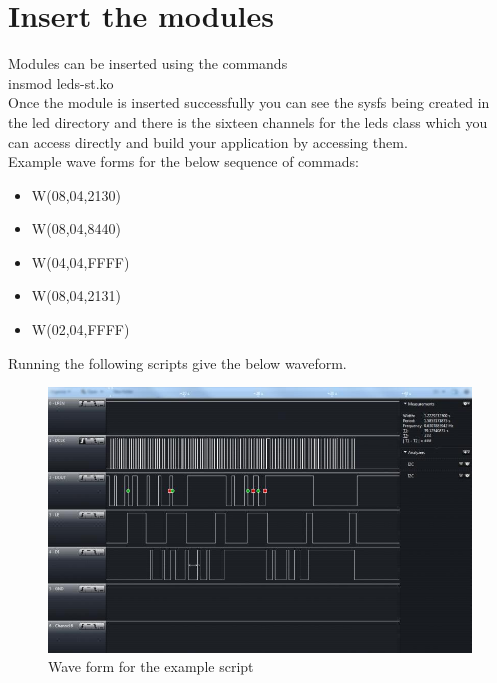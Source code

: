 \section{Insert the modules}
Modules can be inserted using the commands \\
insmod leds-st.ko\\
Once the module is inserted successfully you can see the sysfs being created in the led directory and there is the sixteen channels for the leds class which you can access
directly and build your application by accessing them.\\
Example wave forms for the below sequence of commads:\\
\begin{itemize}
	\item W(08,04,2130)
	\item W(08,04,8440)
	\item W(04,04,FFFF)
	\item W(08,04,2131)
	\item W(02,04,FFFF)
\end{itemize}
Running the following scripts give the below waveform.
\begin{figure}[ht]
         \centering
         \includegraphics[scale=0.5]{images/waveform.png}
         \caption{Wave form for the example script}
\end{figure}








